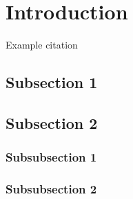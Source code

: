 \documentclass[12pt]{article} %
\begin{document}
\tableofcontents %

\newpage %


\section{Introduction} %

Example citation %


\subsection{Subsection 1} %

\lipsum[1] %


\subsection{Subsection 2} %

\lipsum[2] %


\subsubsection{Subsubsection 1} %

\lipsum[3] %


\subsubsection{Subsubsection 2} %

\lipsum[4] %

\end{document}
